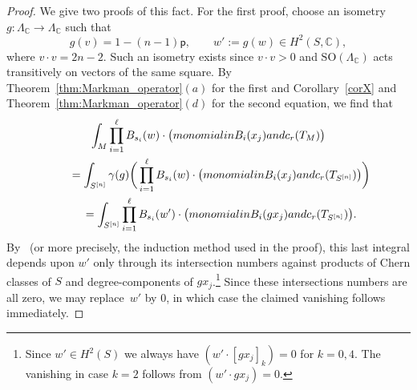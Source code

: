 \documentclass[11pt]{article}
\numberwithin{equation}{section}
\numberwithin{equation}{section}
\newcommand{\BC}{{\mathbb{C}}}
\newcommand{\pt}{{\mathsf{p}}}
\newcommand{\1}{\mathsf{1}}
\newcommand{\SO}{\mathrm{SO}}
\begin{document}
\begin{proof}
We give two proofs of this fact.
For the first proof, choose an isometry $g \colon \Lambda_{\BC} \to \Lambda_{\BC}$ such that
\[
g(v) = 1- (n-1) \pt, \qquad
w' := g(w) \in H^2(S,\BC) ,
\]
where $v \cdot v = 2n-2$. Such an isometry exists since $v \cdot v > 0$ and $\SO(\Lambda_{\BC})$ acts transitively on vectors of the same square.
By Theorem~\ref{thm:Markman_operator}$(a)$ for the first and Corollary~\ref{corX} and Theorem~\ref{thm:Markman_operator}$(d)$ for the second equation, we find that
\begin{gather*}
\int_{M} \prod_{i=1}^{\ell} B_{s_i}(w) \cdot \big(\textup{monomial in } B_i(x_j) \textup{ and } c_r(T_M)\big)
\\ \qquad
{}=\int_{S^{[n]}} \gamma(g)\bigg(\prod_{i=1}^{\ell} B_{s_i}(w) \cdot \big(\textup{monomial in } B_i(x_j) \textup{ and } c_r(T_{S^{[n]}}) \big) \bigg)
\\ \qquad
{}=\int_{S^{[n]}} \prod_{i=1}^{\ell} B_{s_i}(w') \cdot \big(\textup{monomial in } B_i(gx_j) \textup{ and } c_r(T_{S^{[n]}})\big).
\end{gather*}
By~\cite[Theorem 4.1]{EGL} (or more precisely, the induction method used in the proof),
this last integral depends upon $w'$ only through its intersection numbers against products of Chern classes of $S$ and degree-components of $g x_j$.\footnote{Since $w' \in H^2(S)$ we always have
$(w' \cdot [g x_j]_{k} ) = 0$ for $k=0,4$.
The vanishing in case $k=2$ follows from $(w' \cdot gx_j) = 0$.}
Since these intersections numbers are all zero, we may replace~$w'$ by $0$, in which case the claimed vanishing follows immediately.
\end{proof}
\end{document}
